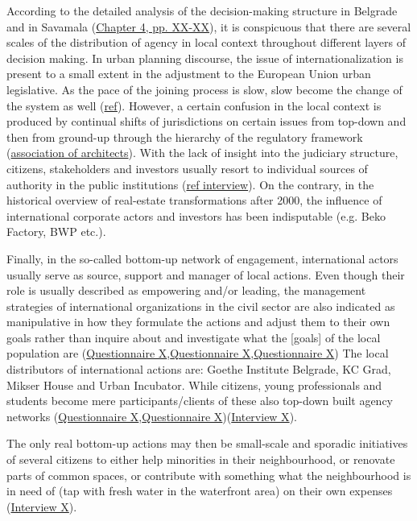 \documentclass[11pt]{report}
\begin{document}
According to the detailed analysis of the decision-making structure in Belgrade and in Savamala (\href{ref}{Chapter 4, pp. XX-XX}), it is conspicuous that there are several scales of the distribution of agency in local context throughout different layers of decision making.
In urban planning discourse, the issue of internationalization is present to a small extent in the adjustment to the European Union urban legislative. As the pace of the joining process is slow, slow become the change of the system as well (\href{ref}{ref}). 
However, a certain confusion in the local context is produced by continual shifts of jurisdictions on certain issues from top-down and then from ground-up through the hierarchy of the regulatory framework (\href{ref}{association of architects}).
With the lack of insight into the judiciary structure, citizens, stakeholders and investors usually resort to individual sources of authority in the public institutions (\href{ref}{ref interview}).
On the contrary, in the historical overview of real-estate transformations after 2000, the influence of international corporate actors and investors has been indisputable (e.g. Beko Factory, BWP etc.).

Finally, in the so-called bottom-up network of engagement, international actors usually serve as source, support and manager of local actions.
Even though their role is usually described as empowering and/or leading, the management strategies of international organizations in the civil sector are also indicated as manipulative in how they formulate the actions and adjust them to their own goals rather than inquire about and investigate what the [goals] of the local  population are (\href{Questionnaire Experts Savamala}{Questionnaire X},\href{Questionnaire PhD Savamala}{Questionnaire X},\href{Questionnaire Student Savamala}{Questionnaire X})
The local distributors of international actions are: Goethe Institute Belgrade, KC Grad, Mikser House and Urban Incubator.
While citizens, young professionals and students become mere participants/clients of these also top-down built agency networks (\href{Questionnaire Experts Savamala}{Questionnaire X},\href{Questionnaire Students Savamala}{Questionnaire X})(\href{InterviewX}{Interview X}).


The only real bottom-up actions may then be small-scale and sporadic initiatives of several citizens to either help minorities in their neighbourhood, or renovate parts of common spaces, or contribute with something what the neighbourhood is in need of (tap with fresh water in the waterfront area) on their own expenses (\href{InterviewX}{Interview X}).
\end{document}
